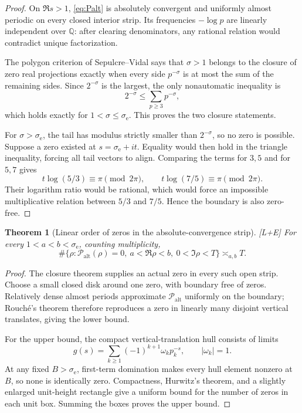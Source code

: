 \documentclass[11pt]{article}
\newtheorem{theorem}{Theorem}[section]
\theoremstyle{definition}
\theoremstyle{remark}
\newcommand{\Palt}{\mathcal P_{\mathrm{alt}}}
\newcommand{\status}[1]{\textnormal{\textcolor{accent}{\footnotesize[#1]}}}
\begin{document}
\begin{proof}
On $\Re s>1$, \eqref{eq:Palt} is absolutely convergent and uniformly almost periodic
on every closed interior strip.  Its frequencies $-\log p$ are linearly independent over
$\mathbb Q$: after clearing denominators, any rational relation would contradict unique
factorization.

The polygon criterion of Sepulcre--Vidal \cite[Theorem~6]{SepulcreVidal} says that
$\sigma>1$ belongs to the closure of zero real projections exactly when every side
$p^{-\sigma}$ is at most the sum of the remaining sides.  Since $2^{-\sigma}$ is the
largest, the only nonautomatic inequality is
\[
 2^{-\sigma}\le\sum_{p\ge3}p^{-\sigma},
\]
which holds exactly for $1<\sigma\le\sigma_{\mathrm e}$.  This proves the two closure
statements.

For $\sigma>\sigma_{\mathrm e}$, the tail has modulus strictly smaller than
$2^{-\sigma}$, so no zero is possible.  Suppose a zero existed at
$s=\sigma_{\mathrm e}+it$.  Equality would then hold in the triangle inequality, forcing
all tail vectors to align.  Comparing the terms for $3,5$ and for $5,7$ gives
\[
 t\log(5/3)\equiv\pi\pmod{2\pi},
 \qquad
 t\log(7/5)\equiv\pi\pmod{2\pi}.
\]
Their logarithm ratio would be rational, which would force an impossible multiplicative
relation between $5/3$ and $7/5$.  Hence the boundary is also zero-free.
\end{proof}

\begin{theorem}[Linear order of zeros in the absolute-convergence strip]
\label{thm:Palt-AP-zero-count}
\status{L+E}
For every $1<a<b<\sigma_{\mathrm e}$, counting multiplicity,
\begin{equation}\label{eq:Palt-AP-zero-count}
 \#\{\rho:\Palt(\rho)=0,\ a<\Re\rho<b,\ 0<\Im\rho<T\}
 \asymp_{a,b}T.
\end{equation}
\end{theorem}

\begin{proof}
The closure theorem supplies an actual zero in every such open strip.  Choose a small
closed disk around one zero, with boundary free of zeros.  Relatively dense almost
periods approximate $\Palt$ uniformly on the boundary; Rouch\'e's theorem therefore
reproduces a zero in linearly many disjoint vertical translates, giving the lower bound.

For the upper bound, the compact vertical-translation hull consists of limits
\[
 g(s)=\sum_{k\ge1}(-1)^{k+1}\omega_kp_k^{-s},\qquad |\omega_k|=1.
\]
At any fixed $B>\sigma_{\mathrm e}$, first-term domination makes every hull element
nonzero at $B$, so none is identically zero.  Compactness, Hurwitz's theorem, and a
slightly enlarged unit-height rectangle give a uniform bound for the number of zeros in
each unit box.  Summing the boxes proves the upper bound.
\end{proof}
\end{document}
